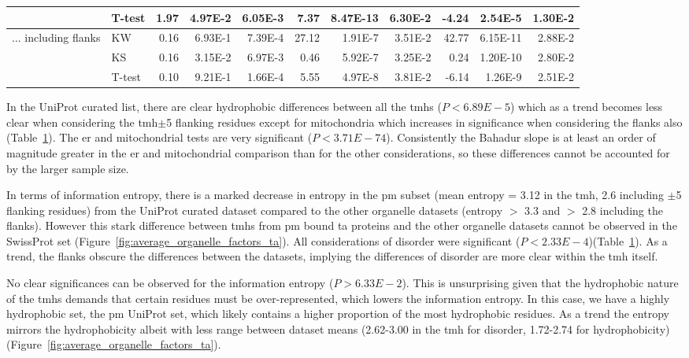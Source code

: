 \begin{table}[htbp]
\begin{tabular}{clrrrrrrrrr}
							&  T-test & 1.97  & 4.97E-2 & 6.05E-3 & 7.37  & 8.47E-13 & 6.30E-2 & -4.24 & 2.54E-5 & 1.30E-2 \\
	\midrule
	\multirow{3}[0]{*}{... including flanks} &  KW & 0.16  & 6.93E-1 & 7.39E-4 & 27.12 & 1.91E-7 & 3.51E-2 & 42.77 & 6.15E-11 & 2.88E-2 \\
							&  KS & 0.16  & 3.15E-2 & 6.97E-3 & 0.46  & 5.92E-7 & 3.25E-2 & 0.24  & 1.20E-10 & 2.80E-2 \\
							&  T-test & 0.10  & 9.21E-1 & 1.66E-4 & 5.55  & 4.97E-8 & 3.81E-2 & -6.14 & 1.26E-9 & 2.51E-2 \\
	\end{tabular}%
					\label{table:organellesuniprotstats}
	\end{table}%

In the UniProt curated list, there are clear hydrophobic differences between all the \gls{tmh}s ($P<6.89E-5$) which as a trend becomes less clear when considering the \gls{tmh}$\pm$5 flanking residues except for mitochondria which increases in significance when considering the flanks also (Table~\ref{table:organellesuniprotstats}).
The \gls{er} and mitochondrial tests are very significant ($P<3.71E-74$).
Consistently the Bahadur slope is at least an order of magnitude greater in the \gls{er} and mitochondrial comparison than for the other considerations, so these differences cannot be accounted for by the larger sample size.

In terms of information entropy, there is a marked decrease in entropy in the \gls{pm} subset (mean entropy = 3.12 in the \gls{tmh}, 2.6 including $\pm$5 flanking residues) from the UniProt curated dataset compared to the other organelle datasets (entropy $>$ 3.3 and $>$ 2.8 including the flanks).
However this stark difference between \gls{tmh}s from \gls{pm} bound \gls{ta} proteins and the other organelle datasets cannot be observed in the SwissProt set (Figure~\ref{fig:average_organelle_factors_ta}).
All considerations of disorder were significant ($P<2.33E-4$)(Table~\ref{table:organellesuniprotstats}).
As a trend, the flanks obscure the differences between the datasets, implying the differences of disorder are more clear within the \gls{tmh} itself.

No clear significances can be observed for the information entropy ($P>6.33E-2$).
This is unsurprising given that the hydrophobic nature of the \gls{tmh}s demands that certain residues must be over-represented, which lowers the information entropy.
In this case, we have a highly hydrophobic set, the \gls{pm} UniProt set, which likely contains a higher proportion of the most hydrophobic residues.
As a trend the entropy mirrors the hydrophobicity albeit with less range between dataset means (2.62-3.00 in the \gls{tmh} for disorder, 1.72-2.74 for hydrophobicity)(Figure~\ref{fig:average_organelle_factors_ta}).


